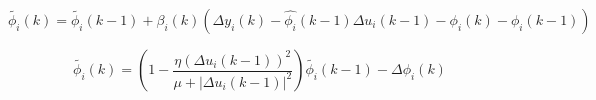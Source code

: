 \documentclass[journal,onecolumn]{IEEEtran}
\begin{document}
 
\begin{equation}
    \label{model 17}
    \tilde{\phi_i}(k) = \tilde{\phi_i}(k-1)+\beta_i(k)  (\Delta y_i(k) - \hat{\phi_i}(k-1)\Delta u_i(k-1) -\phi_i(k) - \phi_i(k-1))
\end{equation}


\begin{equation}
    \label{model 19}
    \tilde{\phi_i}(k) = (1-\frac{\eta(\Delta u_i(k-1))^2}{\mu + |\Delta u_i(k-1)|^2})\tilde{\phi_i}(k-1) - \Delta \phi_i(k)
\end{equation}









\end{document}
